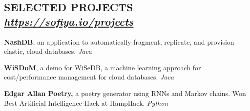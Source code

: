 \documentclass{res}
\begin{document}
\begin{resume}
\section{SELECTED PROJECTS ~  {\sl \href{https://sofiya.io/projects}{https://sofiya.io/projects}}}
\vspace{2mm}
\textbf{NashDB}, an application to automatically fragment, replicate, and provision elastic, cloud databases. {\sl Java }

\textbf{WiSDoM}, a demo for WiSeDB, a machine learning approach for cost/performance management for cloud databases. {\sl Java}
		
\textbf{Edgar Allan Poetry,} a poetry generator using RNNs and Markov chains. Won Best Artificial Intelligence Hack at HampHack. {\sl Python}
\vspace{2mm}


\end{resume}
\end{document}
